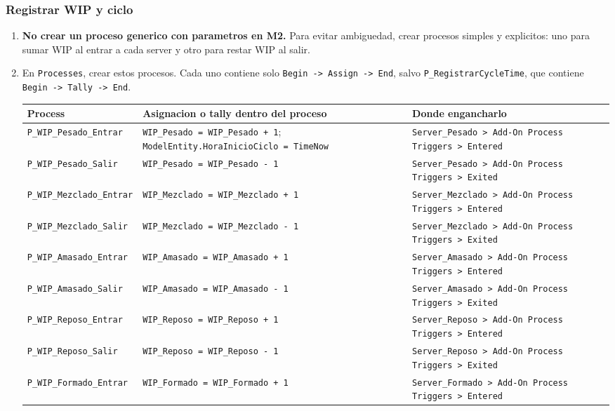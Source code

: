 \documentclass[11pt]{article}
\newcommand{\simio}[1]{\texttt{#1}}
\newcommand{\state}[1]{\texttt{#1}}
\newcommand{\proc}[1]{\texttt{#1}}
\begin{document}
\subsubsection{Registrar WIP y ciclo}
\begin{enumerate}
  \item \textbf{No crear un proceso generico con parametros en M2.} Para evitar ambiguedad, crear procesos simples y explicitos: uno para sumar WIP al entrar a cada server y otro para restar WIP al salir.
  \item En \simio{Processes}, crear estos procesos. Cada uno contiene solo \simio{Begin -> Assign -> End}, salvo \proc{P\_RegistrarCycleTime}, que contiene \simio{Begin -> Tally -> End}.

  \begin{center}
  \small
  \begin{tabularx}{\linewidth}{L{42mm}L{55mm}Y}
  \toprule
  Process & Asignacion o tally dentro del proceso & Donde engancharlo \\
  \midrule
  \proc{P\_WIP\_Pesado\_Entrar} & \state{WIP\_Pesado = WIP\_Pesado + 1}; \state{ModelEntity.HoraInicioCiclo = TimeNow} & \simio{Server\_Pesado > Add-On Process Triggers > Entered} \\
  \proc{P\_WIP\_Pesado\_Salir} & \state{WIP\_Pesado = WIP\_Pesado - 1} & \simio{Server\_Pesado > Add-On Process Triggers > Exited} \\
  \proc{P\_WIP\_Mezclado\_Entrar} & \state{WIP\_Mezclado = WIP\_Mezclado + 1} & \simio{Server\_Mezclado > Add-On Process Triggers > Entered} \\
  \proc{P\_WIP\_Mezclado\_Salir} & \state{WIP\_Mezclado = WIP\_Mezclado - 1} & \simio{Server\_Mezclado > Add-On Process Triggers > Exited} \\
  \proc{P\_WIP\_Amasado\_Entrar} & \state{WIP\_Amasado = WIP\_Amasado + 1} & \simio{Server\_Amasado > Add-On Process Triggers > Entered} \\
  \proc{P\_WIP\_Amasado\_Salir} & \state{WIP\_Amasado = WIP\_Amasado - 1} & \simio{Server\_Amasado > Add-On Process Triggers > Exited} \\
  \proc{P\_WIP\_Reposo\_Entrar} & \state{WIP\_Reposo = WIP\_Reposo + 1} & \simio{Server\_Reposo > Add-On Process Triggers > Entered} \\
  \proc{P\_WIP\_Reposo\_Salir} & \state{WIP\_Reposo = WIP\_Reposo - 1} & \simio{Server\_Reposo > Add-On Process Triggers > Exited} \\
  \proc{P\_WIP\_Formado\_Entrar} & \state{WIP\_Formado = WIP\_Formado + 1} & \simio{Server\_Formado > Add-On Process Triggers > Entered} \\

\end{tabularx}
\end{center}
\end{enumerate}
\end{document}
